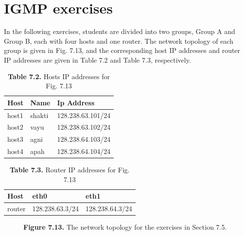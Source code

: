 \documentclass[10pt,a4paper]{article}
\numberwithin{equation}{section}
\numberwithin{figure}{section}
\numberwithin{table}{section}
\begin{document}
\section*{IGMP exercises}
    In the following exercises, students are divided into two groups, Group A and Group B, each with four hosts and one router.
    The network topology of each group is given in Fig.
    7.13, and the corresponding host IP addresses and router IP addresses are given in Table 7.2 and Table 7.3, respectively.

    \begin{table}[H]
		\caption{\textbf{Table 7.2.} Hosts IP addresses for Fig. 7.13}
		\label{tbl:7.2}
        \vspace{5pt}
        \centering
        \large
        \begin{tabular}{ *3l }
            \hline \hline
            Host & Name & Ip Address \\
            \hline
                host1 & shakti & 128.238.63.101/24 \\
                host2 & vayu   & 128.238.63.102/24 \\
                host3 & agni   & 128.238.64.103/24 \\
                host4 & apah   & 128.238.64.104/24 \\
            \hline \hline
            \end{tabular}
    \end{table}

    \begin{table}[H]
		\caption{\textbf{Table 7.3.} Router IP addresses for Fig. 7.13}
		\label{tbl:7.3}
        \vspace{5pt}
        \centering
        \large
        \begin{tabular}{ *3l }
            \hline \hline
            Host & eth0 & eth1 \\
            \hline
            router & 128.238.63.3/24 & 128.238.64.3/24 \\
            \hline \hline
            \end{tabular}
    \end{table}

    \begin{figure}[H]
        \centering
		\caption{\textbf{Figure 7.13.} The network topology for the exercises in Section 7.5.}
		\label{fig:7.13}
    \end{figure}
\end{document}
